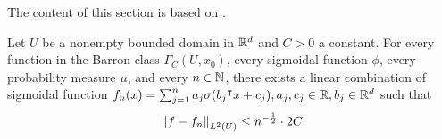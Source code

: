 The content of this section is based on
\cite{barronUniversalApproximationBounds1993}.



\begin{theorem}
    \label{thm:barron_1993_1}
    Let $U$ be a nonempty bounded domain in $\mathbb{R}^d$ and $C > 0$ a constant. For
    every function in the Barron class $\Gamma_C(U, x_0)$, every sigmoidal
    function $\phi$, every probability measure $\mu$, and every $n \in \mathbb{N}$,
    there exists a linear combination of sigmoidal function $f_n(x) =
    \sum_{j=1}^n a_j \sigma(b_j{}^{\intercal} x+c_j), a_j, c_j \in \mathbb{R}, b_j \in \mathbb{R}^d$ such
    that
    \begin{equation}
        \left\| f - f_n \right\|_{L^{2}(U)}\leq n^{-\frac{1}{2}} \cdot 2C
    \end{equation}
\end{theorem}


